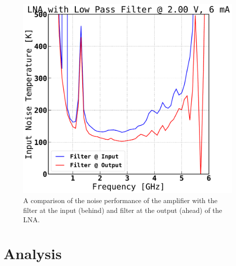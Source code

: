 \documentclass[twocolumn, aps, apl]{revtex4-1}
\begin{document}
\begin{itemize}
    \begin{figure}[!htbp]
    \centering
    \includegraphics[scale=0.3]{Filter_noisetemp_comparison.pdf}
    \caption{A comparison of the noise performance of the amplifier with the filter at the input (behind) and filter at the output (ahead) of the LNA.}
    \label{fig:filtertempcomparison}
    \end{figure}

\end{itemize}

\section*{Analysis}
\end{document}
